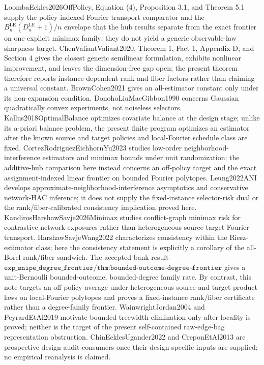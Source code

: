 \documentclass{article}
\begin{document}
LoombaEckles2026OffPolicy, Equation (4), Proposition 3.1, and Theorem 5.1 supply the policy-indexed Fourier transport comparator and the \(B_n^{\mathrm{LE}}(D_n^{\mathrm{LE}}+1)/n\) envelope that the hub results separate from the exact frontier on one explicit minimax family; they do not yield a generic observable-law sharpness target. ChenValiantValiant2020, Theorem 1, Fact 1, Appendix D, and Section 4 gives the closest generic semilinear formulation, exhibits nonlinear improvement, and leaves the dimension-free gap open; the present theorem therefore reports instance-dependent rank and fiber factors rather than claiming a universal constant. BrownCohen2021 gives an all-estimator constant only under its non-expansion condition. DonohoLiuMacGibbon1990 concerns Gaussian quadratically convex experiments, not noiseless selectors. Kallus2018OptimalBalance optimizes covariate balance at the design stage; unlike its a-priori balance problem, the present finite program optimizes an estimator after the known source and target policies and local-Fourier schedule class are fixed. CortezRodriguezEichhornYu2023 studies low-order neighborhood-interference estimators and minimax bounds under unit randomization; the additive-hub comparison here instead concerns an off-policy target and the exact assignment-indexed linear frontier on bounded Fourier polytopes. Leung2022ANI develops approximate-neighborhood-interference asymptotics and conservative network-HAC inference; it does not supply the fixed-instance selector-risk dual or the rank/fiber-calibrated consistency implication proved here. KandirosHarshawSavje2026Minimax studies conflict-graph minimax risk for contrastive network exposures rather than heterogeneous source-target Fourier transport. HarshawSavjeWang2022 characterizes consistency within the Riesz-estimator class; here the consistency statement is explicitly a corollary of the all-Borel rank/fiber sandwich. The accepted-bank result \(\texttt{exp\_snipe\_degree\_frontier/thm:bounded-outcome-degree-frontier}\) gives a unit-Bernoulli bounded-outcome, bounded-degree family rate. By contrast, this note targets an off-policy average under heterogeneous source and target product laws on local-Fourier polytopes and proves a fixed-instance rank/fiber certificate rather than a degree-family frontier. WainwrightJordan2004 and PeyrardEtAl2019 motivate bounded-treewidth elimination only after locality is proved; neither is the target of the present self-contained raw-edge-bag representation obstruction. ChinEcklesUgander2022 and CreponEtAl2013 are prospective design-audit consumers once their design-specific inputs are supplied; no empirical reanalysis is claimed.
\end{document}
